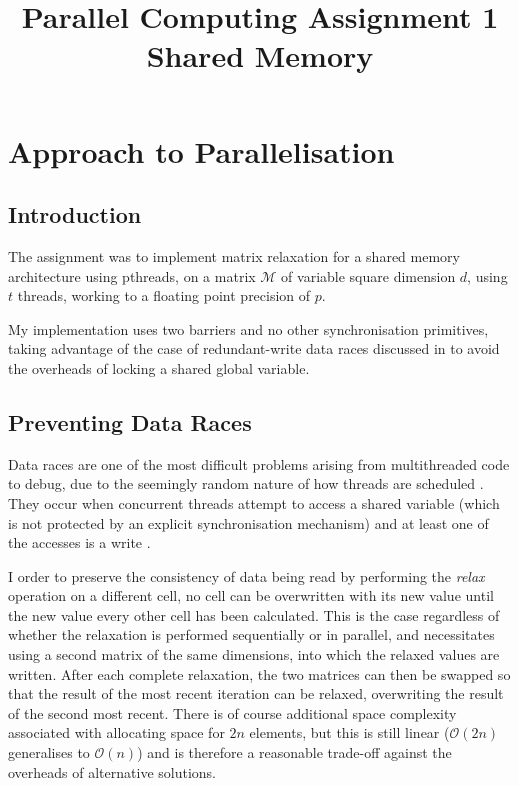 \documentclass[12pt]{article}
\title{\textbf{Parallel Computing Assignment 1 \\ Shared Memory}}
\begin{document}
\maketitle


\tableofcontents
\listoffigures
\clearpage


\section{Approach to Parallelisation}

\subsection{Introduction}

The assignment was to implement matrix relaxation for a shared memory architecture using pthreads, on a matrix $\mathcal{M}$ of variable square dimension $d$, using $t$ threads, working to a floating point precision of $p$.

My implementation uses two barriers and no other synchronisation primitives, taking advantage of the case of redundant-write data races discussed in \citep{benigndataraces} to avoid the overheads of locking a shared global variable.

\subsection{Preventing Data Races}

Data races are one of the most difficult problems arising from multithreaded code to debug, due to the seemingly random nature of how threads are scheduled \citep{highleveldataraces}. They occur when concurrent threads attempt to access a shared variable (which is not protected by an explicit synchronisation mechanism) and at least one of the accesses is a write \citep{eraser}.

I order to preserve the consistency of data being read by performing the \textit{relax} operation on a different cell, no cell can be overwritten with its new value until the new value every other cell has been calculated. This is the case regardless of whether the relaxation is performed sequentially or in parallel, and necessitates using a second matrix of the same dimensions, into which the relaxed values are written. After each complete relaxation, the two matrices can then be swapped so that the result of the most recent iteration can be relaxed, overwriting the result of the second most recent. There is of course additional space complexity associated with allocating space for $2n$ elements, but this is still linear ($\mathcal{O}(2n)$ generalises to $\mathcal{O}(n)$) and is therefore a reasonable trade-off against the overheads of alternative solutions.
\end{document}
